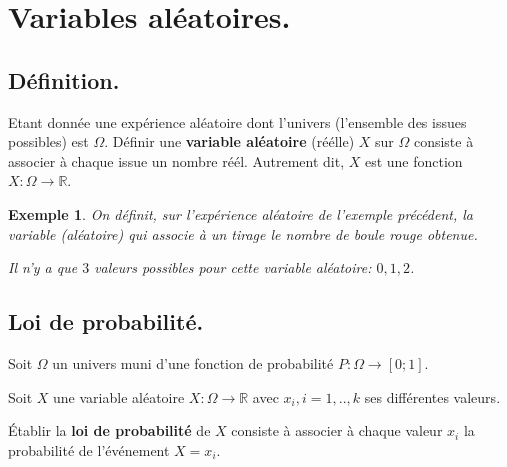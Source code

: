 \documentclass[a4paper,11pt]{article}
\theoremstyle{break}
\newcounter{enonce}
\newtheorem{exemple}[enonce]{Exemple}
\begin{document}
 \section{Variables aléatoires.}
  
  \subsection{Définition.}
  
  
   \begin{definition}
      Etant donnée une expérience aléatoire dont l'univers (l'ensemble des issues possibles) est 
      $\Omega$. Définir une \textbf{variable aléatoire} (réélle) $X$ sur $\Omega$ consiste à associer à
      chaque issue un nombre réél. Autrement dit, $X$ est une fonction $X:\Omega \to \mathbb{R}$.
   \end{definition}
  
  
  
    \begin{exemple}
   
   On définit, sur l'expérience aléatoire de l'exemple précédent, la variable (aléatoire) qui
   associe à un tirage le nombre de boule rouge obtenue.
   
   Il n'y a que $3$ valeurs possibles pour cette variable aléatoire: $0,1,2$.
  
   \end{exemple}
  
  
  \subsection{Loi de probabilité.}
  
  
  \begin{definition} 
    
   Soit $\Omega$ un univers muni d'une fonction de probabilité $P:\Omega \to [0;1]$.
   
   Soit $X$ une variable aléatoire $X:\Omega \to \mathbb{R}$ avec $x_i,i=1,..,k$ ses différentes 
   valeurs.
   
   \'Etablir la \textbf{loi de probabilité} de $X$ consiste à associer à chaque valeur $x_i$ la probabilité
   de l'événement $X=x_i$.
   
   \end{definition}
   
\end{document}
